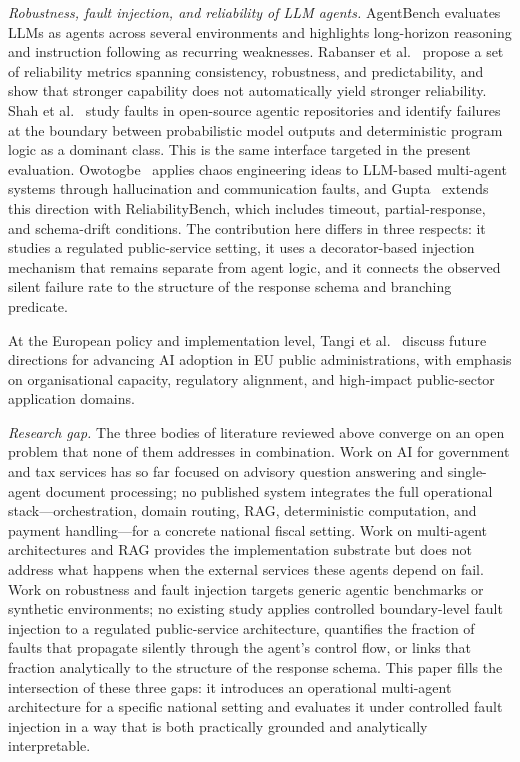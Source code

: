 \documentclass[3p,times,procedia]{elsarticle}
\begin{document}
\textit{Robustness, fault injection, and reliability of LLM agents.}
AgentBench \cite{Liu2024AgentBench} evaluates LLMs as agents across several environments and highlights long-horizon reasoning and instruction following as recurring weaknesses. Rabanser et al.~\cite{Rabanser2026} propose a set of reliability metrics spanning consistency, robustness, and predictability, and show that stronger capability does not automatically yield stronger reliability. Shah et al.~\cite{Shah2026} study faults in open-source agentic repositories and identify failures at the boundary between probabilistic model outputs and deterministic program logic as a dominant class. This is the same interface targeted in the present evaluation. Owotogbe~\cite{Owotogbe2025} applies chaos engineering ideas to LLM-based multi-agent systems through hallucination and communication faults, and Gupta~\cite{Gupta2026} extends this direction with ReliabilityBench, which includes timeout, partial-response, and schema-drift conditions. The contribution here differs in three respects: it studies a regulated public-service setting, it uses a decorator-based injection mechanism that remains separate from agent logic, and it connects the observed silent failure rate to the structure of the response schema and branching predicate.

At the European policy and implementation level, Tangi et al.~\cite{Tangi2026JRC} discuss future directions for advancing AI adoption in EU public administrations, with emphasis on organisational capacity, regulatory alignment, and high-impact public-sector application domains.

\textit{Research gap.}
The three bodies of literature reviewed above converge on an open problem that none of them addresses in combination. Work on AI for government and tax services has so far focused on advisory question answering and single-agent document processing; no published system integrates the full operational stack---orchestration, domain routing, RAG, deterministic computation, and payment handling---for a concrete national fiscal setting. Work on multi-agent architectures and RAG provides the implementation substrate but does not address what happens when the external services these agents depend on fail. Work on robustness and fault injection targets generic agentic benchmarks or synthetic environments; no existing study applies controlled boundary-level fault injection to a regulated public-service architecture, quantifies the fraction of faults that propagate silently through the agent's control flow, or links that fraction analytically to the structure of the response schema. This paper fills the intersection of these three gaps: it introduces an operational multi-agent architecture for a specific national setting and evaluates it under controlled fault injection in a way that is both practically grounded and analytically interpretable.
\end{document}
